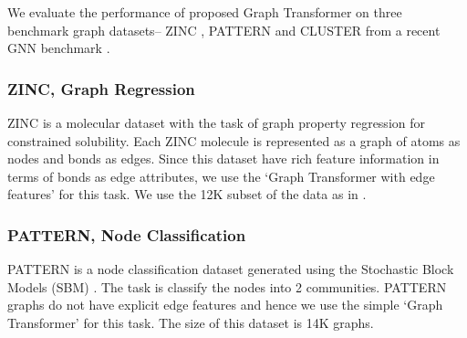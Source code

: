 \documentclass[letterpaper]{article} \usepackage{aaai21}  \usepackage{times}  \usepackage{helvet} \usepackage{courier}  \usepackage[hyphens]{url}  \usepackage{graphicx} \urlstyle{rm} \def\UrlFont{\rm}  \usepackage{natbib}  \usepackage{caption} \usepackage{xcolor}
\begin{document}
\begin{table}[t!]
    \centering
\caption{
    Comparison of our best performing scores (from Table \ref{tab:results}) on each dataset against the GNN baselines (GCN \cite{kipf2017semi}, GAT \cite{velickovic2018graph}, GatedGCN\cite{bresson2017residual}) 
    of 500k model parameters. 
\textbf{Note:} Only GatedGCN and GT models use the available edge attributes in ZINC.
    }
    \label{tab:results_comparison}
\end{table}

We evaluate the performance of proposed Graph Transformer on three benchmark graph datasets-- ZINC \cite{irwin2012zinc}, PATTERN and CLUSTER \cite{abbe2017community} from a recent GNN benchmark \cite{dwivedi2020benchmarking}. 

\subsubsection{ZINC, Graph Regression}
ZINC \cite{irwin2012zinc} is a molecular dataset with the task of graph property regression for constrained solubility. Each ZINC molecule is represented as a graph of atoms as nodes and bonds as edges. Since this dataset have rich feature information in terms of bonds as edge attributes, we use the `Graph Transformer with edge features' for this task. We use the 12K subset of the data as in \citet{dwivedi2020benchmarking}.
\subsubsection{PATTERN, Node Classification}
PATTERN is a node classification dataset generated using the Stochastic Block Models (SBM) \cite{abbe2017community}. The task is classify the nodes into 2 communities. PATTERN graphs do not have explicit edge features and hence we use the simple `Graph Transformer' for this task. The size of this dataset is 14K graphs.
\end{document}
